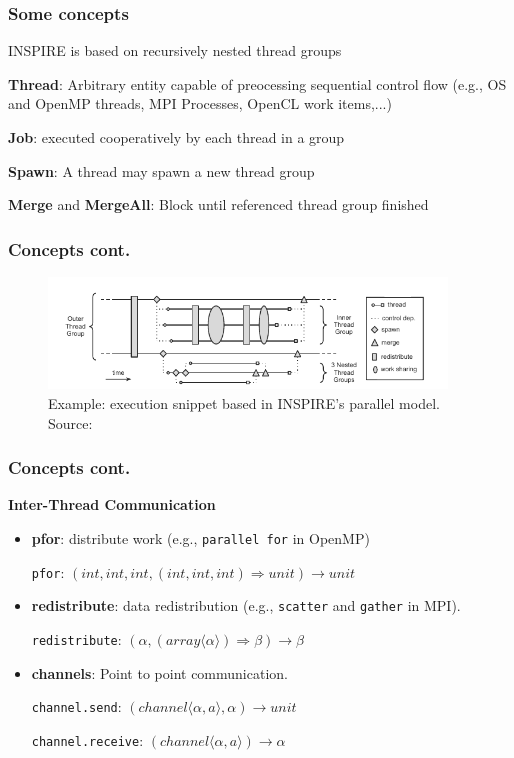 \documentclass{beamer}
\newcommand\fB[1]{\textcolor{blue!80!black}{\textbf{#1}}}
\begin{document}
\begin{frame}
\frametitle{Some concepts}
INSPIRE is based on recursively nested thread groups

\bigskip
\fB{Thread}: Arbitrary entity capable of preocessing sequential control flow (e.g., OS and OpenMP threads, MPI Processes, OpenCL work items,...)

\bigskip
\fB{Job}: executed cooperatively by each thread in a group

\bigskip
\fB{Spawn}: A thread may spawn a new thread group

\bigskip
\fB{Merge} and \fB{MergeAll}: Block until referenced thread group finished 
\end{frame}

\begin{frame}
\frametitle{Concepts cont.}

\begin{figure}
\centering
\includegraphics[width=300pt]{sampleExec}
\caption{Example: execution snippet based in INSPIRE's parallel model. Source: \cite{JordanPTKF13}}
\end{figure}

\end{frame}

\begin{frame}
\frametitle{Concepts cont.}
\fB{Inter-Thread Communication}
\begin{itemize}
\item \fB{pfor}: distribute work (e.g., \texttt{parallel for} in OpenMP)

\texttt{pfor}: $(int,int,int,(int,int,int) \Rightarrow unit) \rightarrow unit $  

\bigskip\pause
\item \fB{redistribute}: data redistribution (e.g., \texttt{scatter} and \texttt{gather} in MPI). 

\texttt{redistribute}: $(\alpha, (array \langle\alpha\rangle) \Rightarrow \beta) \rightarrow \beta$

\bigskip\pause
\item \fB{channels}: Point to point communication.

\texttt{channel.send}: $(channel\langle\alpha , a\rangle, \alpha) \rightarrow unit$

\texttt{channel.receive}: $(channel\langle\alpha, a\rangle) \rightarrow \alpha $

\end{itemize}

\end{frame}
\end{document}
